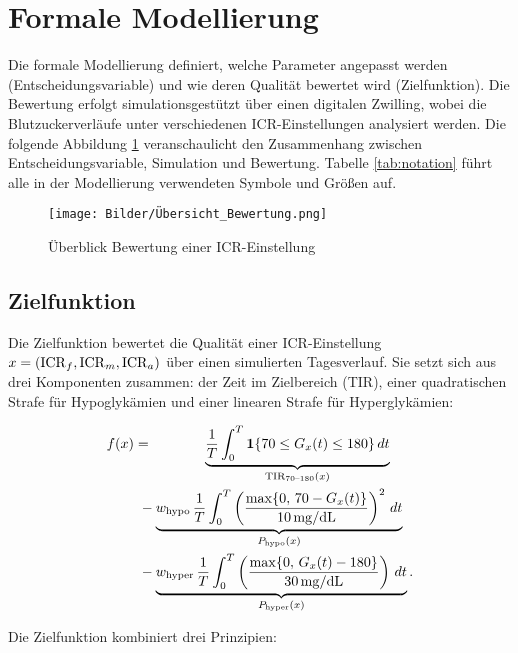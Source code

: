 \section{Formale Modellierung} \label{modellierung}

Die formale Modellierung definiert, welche Parameter angepasst werden (Entscheidungsvariable) und wie deren Qualität bewertet wird (Zielfunktion). Die Bewertung erfolgt simulationsgestützt über einen digitalen Zwilling, wobei die Blutzuckerverläufe unter verschiedenen ICR-Einstellungen analysiert werden. Die folgende Abbildung \ref{fig:überblick} veranschaulicht den Zusammenhang zwischen Entscheidungsvariable, Simulation und Bewertung. Tabelle \ref{tab:notation} führt alle in der Modellierung verwendeten Symbole und Größen auf.

\begin{figure}[h!]
    \centering
    \texttt{[image: Bilder/Übersicht\_Bewertung.png]}
    \caption{Überblick Bewertung einer ICR-Einstellung}
    \label{fig:überblick}
\end{figure}

\subsection{Zielfunktion}

Die Zielfunktion bewertet die Qualität einer ICR-Einstellung \(x = (\mathrm{ICR}_f, \mathrm{ICR}_m, \mathrm{ICR}_a)\) über einen simulierten Tagesverlauf. Sie setzt sich aus drei Komponenten zusammen: der Zeit im Zielbereich (TIR), einer quadratischen Strafe für Hypoglykämien und einer linearen Strafe für Hyperglykämien:

\begin{align}
f(x)
&= \phantom{-\,w_{\mathrm{hypo}}\,}\underbrace{\frac{1}{T}\int_{0}^{T}\Ind\{70 \le G_{x}(t) \le 180\}\,dt}_{\mathrm{TIR}_{70\text{--}180}(x)} \nonumber\\
&\ - \underbrace{w_{\mathrm{hypo}}\,\frac{1}{T}\int_{0}^{T}\left(\frac{\max\{0,\,70 - G_{x}(t)\}}{\Hhypo}\right)^{2}\,dt}_{P_{\mathrm{hypo}}(x)} \nonumber\\
&\ - \underbrace{w_{\mathrm{hyper}}\,\frac{1}{T}\int_{0}^{T}\left(\frac{\max\{0,\,G_{x}(t) - 180\}}{\Hhyper}\right)\,dt}_{P_{\mathrm{hyper}}(x)}.
\end{align}

\noindent Die Zielfunktion kombiniert drei Prinzipien:

